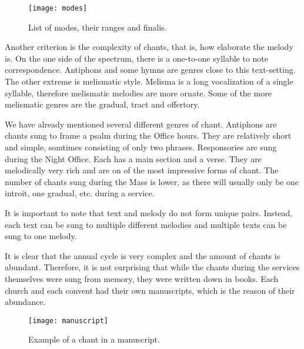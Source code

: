 \begin{figure}[h]
\centering
\texttt{[image: modes]}
\caption{List of modes, their ranges and finalis. \cite[p.~44]{chant_book}}
\end{figure}

Another criterion is the complexity of chants, that is, how elaborate the melody is. On the one side of the spectrum, there is a one-to-one
syllable to note correspondence. Antiphons and some hymns are genres close to this text-setting. The other extreme is melismatic style. Melisma
is a long vocalization of a single syllable, therefore melismatic melodies are more ornate. Some of the more melismatic genres are the gradual,
tract and offertory.

We have already mentioned several different genres of chant. Antiphons are chants sung to frame a psalm during the Office hours. They are relatively
short and simple, somtimes consisting of only two phrases. Responsories are sung during the Night Office. Each has a main section and a verse. They are
melodically very rich and are on of the most impressive forms of chant. The number of chants sung during the Mass is lower, as there will usually
only be one introit, one gradual, etc. during a service.

It is important to note that text and melody do not form unique pairs. Instead, each text
can be sung to multiple different melodies and multiple texts can be sung to one melody.

It is clear that the annual cycle is very complex and the amount of chants is abundant. Therefore, it is not surprising that while the chants during the
services themselves were sung from memory, they were written down in books. Each church and each convent had their own manuscripts, which is the
reason of their abundance.

\begin{figure}[h]
\centering
\texttt{[image: manuscript]}
\caption{Example of a chant in a manuscript. \cite[id~007553]{cantus_db}}
\end{figure}


